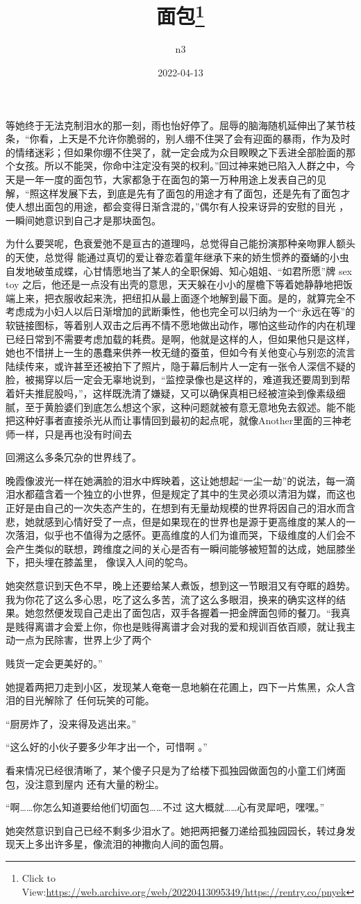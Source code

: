\documentclass{article}
\title{面包\footnote{Click to View:\url{https://web.archive.org/web/20220413095349/https://rentry.co/pnyek}}}
\author{n3}
\date{2022-04-13}
\begin{document}

\maketitle


\Large

﻿等她终于无法克制泪水的那一刻，雨也怡好停了。屈辱的脑海随机延伸出了某节枝条，“你看，上天是不允许你脆弱的，别人绷不住哭了会有迎面的暴雨，作为及时的情绪迷彩；但如果你绷不住哭了，就一定会成为众目睽睽之下丢进全部脸面的那个女孩。所以不能哭，你命中注定没有哭的权利。”回过神来她已陷入人群之中，今天是一年一度的面包节，大家都急于在面包的第一万种用途上发表自己的见解，“照这样发展下去，到底是先有了面包的用途才有了面包，还是先有了面包才使人想出面包的用途，都会变得日渐含混的，”偶尔有人投来讶异的安慰的目光
，一瞬间她意识到自己才是那块面包。 

为什么要哭呢，色衰爱弛不是亘古的道理吗，总觉得自己能扮演那种亲吻罪人额头的天使，总觉得
\newpage
能通过真切的爱让眷恋着童年继承下来的娇生惯养的蚕蛹的小虫自发地破茧成蝶，心甘情愿地当了某人的全职保姆、知心姐姐、“如君所愿”牌 sex toy 之后，他还是一点没有出壳的意思，天天躲在小小的屋檐下等着她静静地把饭端上来，把衣服收起来洗，把纽扣从最上面逐个地解到最下面。是的，就算完全不考虑成为小妇人以后日渐增加的武断秉性，他也完全可以归纳为一个“永远在等”的软链接图标，等着别人双击之后再不情不愿地做出动作，哪怕这些动作的内在机理已经日常到不需要考虑加载的耗费。是啊，他就是这样的人，但如果他只是这样，她也不惜拼上一生的愚蠢来供养一枚无缝的蚕茧，但如今有关他变心与别恋的流言陆续传来，或许甚至还被拍下了照片，隐于幕后制片人一定有一张令人深信不疑的脸，被揭穿以后一定会无辜地说到，“监控录像也是这样的，难道我还要周到到帮着奸夫推屁股吗，”，这样既洗清了嫌疑，又可以确保真相已经被渲染到像素级细腻，至于黄脸婆们到底怎么想这个家，这种问题就被有意无意地免去叙述。能不能把这种好事者直接杀光从而让事情回到最初的起点呢，就像Another里面的三神老师一样，只是再也没有时间去
\newpage

回溯这么多条冗杂的世界线了。 

晚霞像波光一样在她满脸的泪水中辉映着，这让她想起“一尘一劫”的说法，每一滴泪水都蕴含着一个独立的小世界，但是规定了其中的生灵必须以清泪为媒，而这也正好是由自己的一次失态产生的，在想到有无量劫规模的世界将因自己的泪水而含悲，她就感到心情好受了一点，但是如果现在的世界也是源于更高维度的某人的一次落泪，似乎也不值得为之感怀。更高维度的人们为谁而哭，下级维度的人们会不会产生类似的联想，跨维度之间的关心是否有一瞬间能够被短暂的达成，她屈膝坐下，把头埋在膝盖里，
像误入人间的鸵鸟。 

她突然意识到天色不早，晚上还要给某人煮饭，想到这一节眼泪又有夺眶的趋势。我为你花了这么多心思，吃了这么多苦，流了这么多眼泪，换来的确实这样的结果。她忽然便发现自己走出了面包店，双手各握着一把金牌面包师的餐刀。“我真是贱得离谱才会爱上你，你也是贱得离谱才会对我的爱和规训百依百顺，就让我主动一点为民除害，世界上少了两个
\newpage

贱货一定会更美好的。” 

她提着两把刀走到小区，发现某人奄奄一息地躺在花圃上，四下一片焦黑，众人含泪的目光解除了
任何玩笑的可能。 


“厨房炸了，没来得及逃出来。” 

“这么好的小伙子要多少年才出一个，可惜啊
。” 

看来情况已经很清晰了，某个傻子只是为了给楼下孤独园做面包的小童工们烤面包，没注意到屋内
还有大量的粉尘。 

“啊……你怎么知道要给他们切面包……不过
这大概就……心有灵犀吧，嘿嘿。” 

她突然意识到自己已经不剩多少泪水了。她把两把餐刀递给孤独园园长，转过身发现天上多出许多星，像流泪的神撒向人间的面包屑。
\newpage
\end{document}
